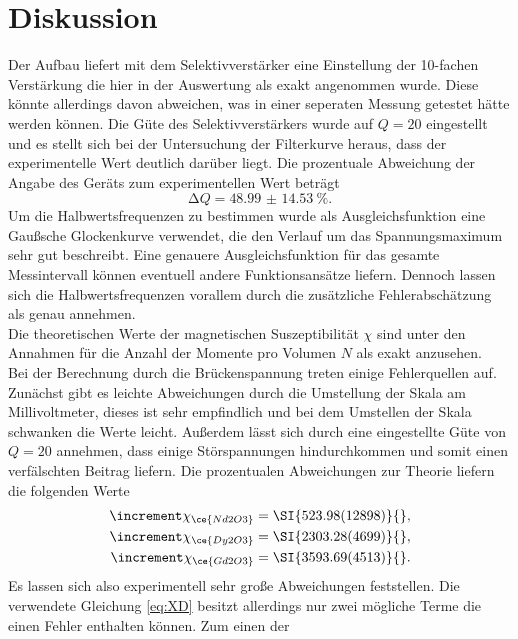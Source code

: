 \section{Diskussion}

Der Aufbau liefert mit dem Selektivverstärker eine Einstellung der 10-fachen Verstärkung die hier in der Auswertung als
exakt angenommen wurde. Diese könnte allerdings davon abweichen, was in einer seperaten Messung getestet hätte werden können. Die Güte des Selektivverstärkers wurde auf $Q = 20$ eingestellt und es stellt sich
bei der Untersuchung der Filterkurve heraus, dass der experimentelle Wert deutlich darüber liegt. Die prozentuale Abweichung der Angabe des Geräts zum experimentellen Wert beträgt
\begin{equation*}
\increment Q  = \SI{48.99(1453)}{\percent}.
\end{equation*}
Um die Halbwertsfrequenzen zu bestimmen wurde als Ausgleichsfunktion eine Gaußsche Glockenkurve verwendet, die den Verlauf um das Spannungsmaximum sehr gut beschreibt. Eine genauere Ausgleichsfunktion für das
gesamte Messintervall können eventuell andere Funktionsansätze liefern. Dennoch lassen sich die Halbwertsfrequenzen vorallem durch die zusätzliche Fehlerabschätzung als genau annehmen. 
\\
\newline
Die theoretischen Werte der magnetischen Suszeptibilität $\chi$ sind unter den Annahmen für die Anzahl der Momente pro Volumen $N$ als exakt anzusehen.
\\
\newline
Bei der Berechnung durch die Brückenspannung treten einige Fehlerquellen auf. Zunächst gibt es leichte Abweichungen durch die Umstellung der Skala am Millivoltmeter, dieses ist sehr empfindlich und bei dem Umstellen der Skala
schwanken die Werte leicht. Außerdem lässt sich durch eine eingestellte Güte von $Q = 20$ annehmen, dass einige Störspannungen hindurchkommen und somit einen verfälschten Beitrag liefern. 
Die prozentualen Abweichungen zur Theorie liefern die folgenden Werte
\begin{align*}
   \increment \chi_{\ce{Nd2O3}} &=\SI{523.98(12898)}{}, \\  
   \increment \chi_{\ce{Dy2O3}} &=\SI{2303.28(4699)}{},\\ 
   \increment \chi_{\ce{Gd2O3}} &=\SI{3593.69(4513)}{}. 
\end{align*}
Es lassen sich also experimentell sehr große Abweichungen feststellen. Die verwendete Gleichung \eqref{eq:XD} besitzt allerdings nur zwei mögliche Terme die einen Fehler enthalten können. Zum einen der
